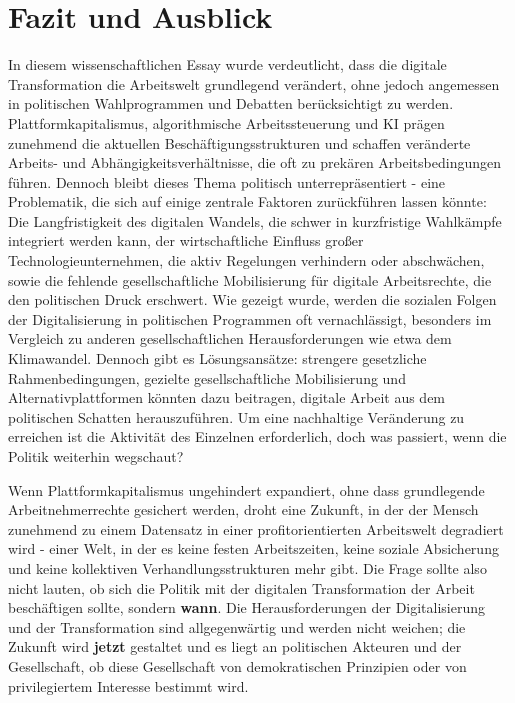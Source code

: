 \documentclass[12pt]{article}
\begin{document}
\section{Fazit und Ausblick}
In diesem wissenschaftlichen Essay wurde verdeutlicht, dass die digitale Transformation die Arbeitswelt grundlegend verändert, ohne jedoch angemessen in politischen Wahlprogrammen und Debatten berücksichtigt zu werden. Plattformkapitalismus, algorithmische Arbeitssteuerung und KI prägen zunehmend die aktuellen Beschäftigungsstrukturen und schaffen veränderte Arbeits- und Abhängigkeitsverhältnisse, die oft zu prekären Arbeitsbedingungen führen. Dennoch bleibt dieses Thema politisch unterrepräsentiert - eine Problematik, die sich auf einige zentrale Faktoren zurückführen lassen könnte: Die Langfristigkeit des digitalen Wandels, die schwer in kurzfristige Wahlkämpfe integriert werden kann, der wirtschaftliche Einfluss großer Technologieunternehmen, die aktiv Regelungen verhindern oder abschwächen, sowie die fehlende gesellschaftliche Mobilisierung für digitale Arbeitsrechte, die den politischen Druck erschwert. Wie gezeigt wurde, werden die sozialen Folgen der Digitalisierung in politischen Programmen oft vernachlässigt, besonders im Vergleich zu anderen gesellschaftlichen Herausforderungen wie etwa dem Klimawandel. Dennoch gibt es Lösungsansätze: strengere gesetzliche Rahmenbedingungen, gezielte gesellschaftliche Mobilisierung und Alternativplattformen könnten dazu beitragen, digitale Arbeit aus dem politischen Schatten herauszuführen. Um eine nachhaltige Veränderung zu erreichen ist die Aktivität des Einzelnen erforderlich, doch was passiert, wenn die Politik weiterhin wegschaut?

\newpage
Wenn Plattformkapitalismus ungehindert expandiert, ohne dass grundlegende Arbeitnehmerrechte gesichert werden, droht eine Zukunft, in der der Mensch zunehmend zu einem Datensatz in einer profitorientierten Arbeitswelt degradiert wird - einer Welt, in der es keine festen Arbeitszeiten, keine soziale Absicherung und keine kollektiven Verhandlungsstrukturen mehr gibt. Die Frage sollte also nicht lauten, ob sich die Politik mit der digitalen Transformation der Arbeit beschäftigen sollte, sondern \textbf{wann}. Die Herausforderungen der Digitalisierung und der Transformation sind allgegenwärtig und werden nicht weichen; die Zukunft wird \textbf{jetzt} gestaltet und es liegt an politischen Akteuren und der Gesellschaft, ob diese Gesellschaft von demokratischen Prinzipien oder von privilegiertem Interesse bestimmt wird.
\end{document}

